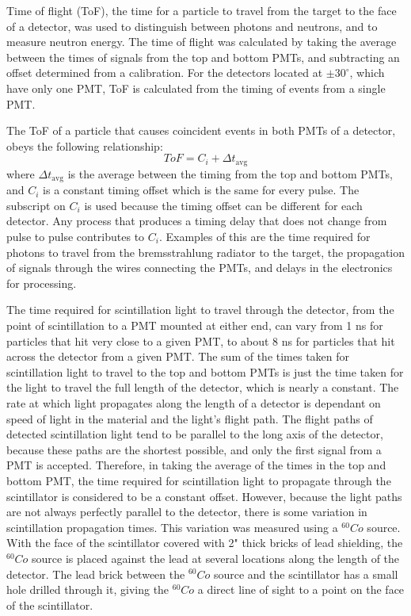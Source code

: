 Time of flight (ToF), the time for a particle to travel from the target to the face of a detector, was used to distinguish between photons and neutrons, and to measure neutron energy.
The time of flight was calculated by taking the average between the times of signals from the top and bottom PMTs, and subtracting an offset determined from a calibration.
For the detectors located at $\pm30^{\circ}$, which have only one PMT, ToF is calculated from the timing of events from a single PMT.

The ToF of a particle that causes coincident events in both PMTs of a detector, obeys the following relationship:
\begin{displaymath}
ToF = C_i + \Delta t_{\text{avg}} 
\end{displaymath}
where $\Delta t_{\text{avg}} $ is the average between the timing from the top and bottom PMTs, and $C_i$ is a constant timing offset which is the same for every pulse.
The subscript on $C_i$ is used because the timing offset can be different for each detector.
Any process that produces a timing delay that does not change from pulse to pulse contributes to $C_{i}$.
Examples of this are the time required for photons to travel from the bremsstrahlung radiator to the target, the propagation of signals through the wires connecting the PMTs, and delays in the electronics for processing.

The time required for scintillation light to travel through the detector, from the point of scintillation to a PMT mounted at either end, can vary from 1 ns for particles that hit very close to a given PMT, to about 8 ns for particles that hit across the detector from a given PMT.
The sum of the times taken for scintillation light to travel to the top and bottom PMTs is just the time taken for the light to travel the full length of the detector, which is nearly a constant.
The rate at which light propagates along the length of a detector is dependant on speed of light in the material and the light's flight path.
The flight paths of detected scintillation light tend to be parallel to the long axis of the detector, because these paths are the shortest possible, and only the first signal from a PMT is accepted.
Therefore, in taking the average of the times in the top and bottom PMT, the time required for scintillation light to propagate through the scintillator is considered to be a constant offset.
However, because the light paths are not always perfectly parallel to the detector, there is some variation in scintillation propagation times.
This variation was measured using a $^{60}Co$ source.
With the face of the scintillator covered with 2" thick bricks of lead shielding, the $^{60}Co$ source is placed against the lead at several locations along the length of the detector.
The lead brick between the $^{60}Co$ source and the scintillator has a small hole drilled through it, giving the $^{60}Co$ a direct line of sight to a point on the face of the scintillator.

